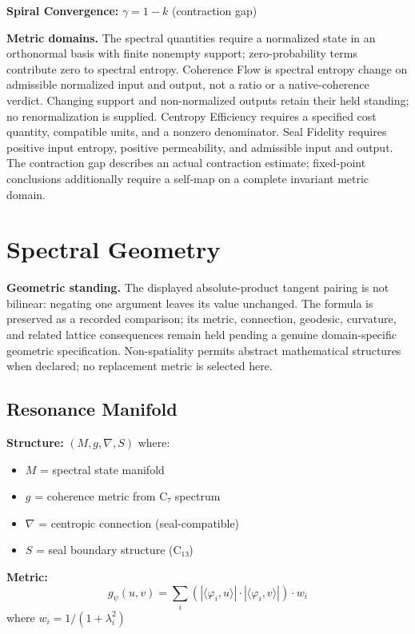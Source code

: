 \documentclass[11pt,a4paper]{article}
\begin{document}
\textbf{Spiral Convergence:} \( \gamma = 1 - k \) (contraction gap)

\textbf{Metric domains.} The spectral quantities require a normalized state in an orthonormal basis with finite nonempty support; zero-probability terms contribute zero to spectral entropy. Coherence Flow is spectral entropy change on admissible normalized input and output, not a ratio or a native-coherence verdict. Changing support and non-normalized outputs retain their held standing; no renormalization is supplied. Centropy Efficiency requires a specified cost quantity, compatible units, and a nonzero denominator. Seal Fidelity requires positive input entropy, positive permeability, and admissible input and output. The contraction gap describes an actual contraction estimate; fixed-point conclusions additionally require a self-map on a complete invariant metric domain.

\section{Spectral Geometry}

\textbf{Geometric standing.} The displayed absolute-product tangent pairing is not bilinear: negating one argument leaves its value unchanged. The formula is preserved as a recorded comparison; its metric, connection, geodesic, curvature, and related lattice consequences remain held pending a genuine domain-specific geometric specification. Non-spatiality permits abstract mathematical structures when declared; no replacement metric is selected here.

\subsection{Resonance Manifold}

\textbf{Structure:} \( (M, g, \nabla, S) \) where:
\begin{itemize}
\item \( M \) = spectral state manifold
\item \( g \) = coherence metric from C₇ spectrum
\item \( \nabla \) = centropic connection (seal-compatible)
\item \( S \) = seal boundary structure (C₁₃)
\end{itemize}

\textbf{Metric:}
\[
g_\psi(u,v) = \sum_i (|\langle\varphi_i,u\rangle| \cdot |\langle\varphi_i,v\rangle|) \cdot w_i
\]
where \( w_i = 1/(1 + \lambda_i^2) \)
\end{document}
